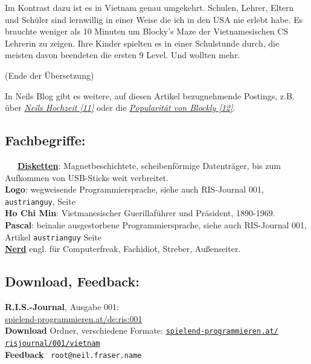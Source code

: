 Im Kontrast dazu ist es in Vietnam genau umgekehrt. Schulen, Lehrer, Eltern und Schüler sind lernwillig in einer Weise die ich in den USA nie erlebt habe. Es brauchte weniger als 10 Minuten um Blocky's Maze der Vietnamesischen CS Lehrerin zu zeigen. Ihre Kinder spielten es in einer Schulstunde durch, die meisten davon beendeten die ersten 9 Level. Und wollten mehr.

(Ende der Übersetzung)

In Neils Blog gibt es weitere, auf diesen Artikel bezugnehmende Postings, z.B. über \href{https://neil.fraser.name/news/2013/04/15/}{\textit{Neils Hochzeit [11]}} oder die \href{https://neil.fraser.name/news/2013/12/31/}{\textit{Popularität von Blockly [12]}}. 

\subsection*{Fachbegriffe:}

~~~\href{http://de.wikipedia.org/wiki/Diskette}{\textbf{Disketten}}: Magnetbeschichtete, scheibenförmige Datenträger, bis zum Aufkommen von USB-Sticks weit verbreitet. \\

\textbf{Logo}: wegweisende Programmiersprache, siehe auch RIS-Journal 001, \texttt{austrianguy}, Seite \pageref{austrianguy} \\

\textbf{Ho Chi Min}: Vietmanesischer Guerillaführer und Präsident, 1890-1969. \\

\textbf{Pascal}: beinahe ausgestorbene Programmiersprache, siehe auch RIS-Journal 001, Artikel \texttt{austrianguy} Seite \pageref{austrianguy} \\

\href{https://de.wikipedia.org/wiki/Nerd}{\textbf{Nerd}} engl. für Computerfreak, Fachidiot, Streber, Außenseiter.


\subsection*{Download, Feedback:}
\textbf{R.I.S.-Journal}, Ausgabe 001: \\
\href{http://spielend-programmieren.at/de:ris:001}{spielend-programmieren.at/de:ris:001}\\
\textbf{Download} Ordner, verschiedene Formate: \href{http://spielend-programmieren.at/risjournal/001/vietnam}{\texttt{spielend-programmieren.at/\\risjournal/001/vietnam}} \\
\textbf{Feedback} \Letter\ \texttt{root@neil.fraser.name} \\

